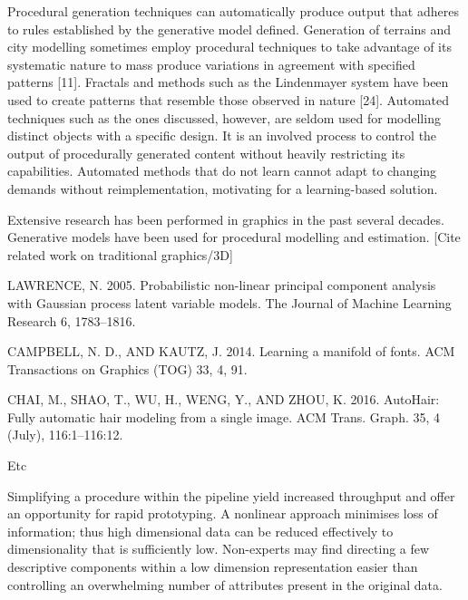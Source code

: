 \documentclass[a4paper, fontsize=15pt, onecolumn]{article} %
\numberwithin{equation}{section} %
\numberwithin{figure}{section} %
\numberwithin{table}{section} %
\begin{document}
Procedural generation techniques can automatically produce output that adheres to rules established by the generative model defined. Generation of terrains and city modelling sometimes employ procedural techniques to take advantage of its systematic nature to mass produce variations in agreement with specified patterns [11]. Fractals and methods such as the Lindenmayer system have been used to create patterns that resemble those observed in nature [24]. Automated techniques such as the ones discussed, however, are seldom used for modelling distinct objects with a specific design. It is an involved process to control the output of procedurally generated content without heavily restricting its capabilities. Automated methods that do not learn cannot adapt to changing demands without reimplementation, motivating for a learning-based solution.


Extensive research has been performed in graphics in the past several decades. Generative models have been used for procedural modelling and estimation.
[Cite related work on traditional graphics/3D]

LAWRENCE, N. 2005. Probabilistic non-linear principal component analysis with Gaussian process latent variable models. The Journal of Machine Learning Research 6, 1783–1816. 

CAMPBELL, N. D., AND KAUTZ, J. 2014. Learning a manifold of fonts. ACM Transactions on Graphics (TOG) 33, 4, 91. 

CHAI, M., SHAO, T., WU, H., WENG, Y., AND ZHOU, K. 2016. AutoHair: Fully automatic hair modeling from a single image. ACM Trans. Graph. 35, 4 (July), 116:1–116:12.

Etc

Simplifying a procedure within the pipeline yield increased throughput and offer an opportunity for rapid prototyping. A nonlinear approach minimises loss of information; thus high dimensional data can be reduced effectively to dimensionality that is sufficiently low. Non-experts may find directing a few descriptive components within a low dimension representation easier than controlling an overwhelming number of attributes present in the original data.
\end{document}
